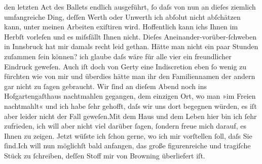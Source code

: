 \begin{ledgroupsized}[t]{13cm}
               den letzten Act des Ballets
               endlich ausgeführt, ſo daſs von nun an dieſes ziemlich umfangreiche Ding, deſſen
               Werth oder Unwerth ich abſolut nicht abſchätzen kann, unter meinen Arbeiten exiſtiren
               wird. Hoffentlich kann ichs Ihnen im Herbſt vorleſen und es miſsfällt Ihnen
               nicht.\pend
           \pstart
           Dieſes Aneinander-vorüber-ſchweben in Innsbruck hat
               mir damals recht leid gethan. Hätte man nicht ein paar Stunden zuſammen ſein können?
               ich glaube daſs wäre für alle vier ein freundlicher Eindruck geweſen.
               Auch iſt doch von Gerty eine Indiscretion eben ſo
               wenig zu fürchten wie von mir und überdies hätte man ihr den Familiennamen der andern gar nicht zu ſagen
               gebraucht. Wir ſind an dieſem Abend noch ins Hofgartengaſthaus nachtmahlen gegangen, dem einzigen Ort, wo man »im Freien
               nachtmahlt« und ich habe ſehr gehofft, {\pb}daſs wir uns dort begegnen würden,
               es iſt aber leider nicht der Fall geweſen.\hspace*{2.5em}Mit dem
               Haus und dem Leben hier bin ich ſehr zufrieden, ich will aber nicht viel darüber
               ſagen, ſondern freue mich darauf, es Ihnen zu zeigen. Jetzt wüſste ich ſchon gerne,
               wo ich mir vorſtellen ſoll, daſs Sie ſind.\hspace*{2.5em}Ich will
               nun möglichſt bald anfangen, das große figurenreiche und tragiſche Stück zu ſchreiben, deſſen Stoff mir von Browning überliefert iſt.\pend
           \pstart

\end{ledgroupsized}
